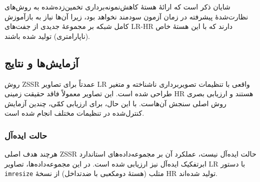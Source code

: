 شایان ذکر است که ارائهٔ هستهٔ کاهش‌نمونه‌برداری تخمین‌زده‌شده به
روش‌های نظارت‌شدهٔ پیشرفته در زمان آزمون سودمند نخواهد بود، زیرا
آن‌ها نیاز به بازآموزش کامل شبکه بر مجموعهٔ جدیدی از جفت‌های
LR-HR دارند که با این هستهٔ خاص (ناپارامتری) تولید شده باشند.

\subsection{آزمایش‌ها و نتایج}
\label{subsec:zssr_experiments}

روش ZSSR عمدتاً برای تصاویر LR واقعی با تنظیمات تصویربرداری ناشناخته
و متغیر طراحی شده است. این تصاویر معمولاً فاقد حقیقت زمینی HR هستند
و ارزیابی بصری روش اصلی سنجش آن‌هاست. با این حال، برای ارزیابی کمّی،
چندین آزمایش کنترل‌شده در تنظیمات مختلف انجام شده است.

\subsubsection{حالت ایده‌آل}

هرچند هدف اصلی ZSSR حالت ایده‌آل نیست، عملکرد آن بر مجموعه‌داده‌های
استاندارد ابرتفکیک ایده‌آل نیز ارزیابی شده است. در این
مجموعه‌داده‌ها، تصاویر LR با دستور \texttt{imresize} متلب (هستهٔ
دومکعبی با ضدتداخل) از نسخهٔ HR تولید شده‌اند.

